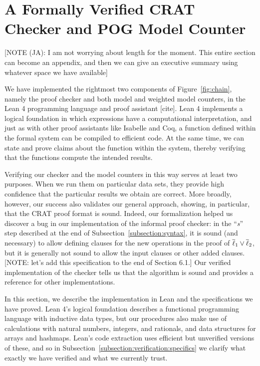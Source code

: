 \section{A Formally Verified CRAT Checker and POG Model Counter}

[NOTE (JA): I am not worrying about length for the moment. This entire section can become an appendix, and then we can give an executive summary using whatever space
we have available]

We have implemented the rightmost two components of Figure~\ref{fig:chain}, namely the
proof checker and both model and weighted model counters, in the Lean 4 programming language
and proof assistant [cite]. Lean 4 implements a logical foundation in which expressions
have a computational interpretation, and just as with other proof assistants like Isabelle and Coq,
a function defined within the formal system can be compiled to efficient code.
At the same time, we can state and prove claims about the function within the system, thereby
verifying that the functions compute the intended results.

Verifying our checker and the model counters in this way serves at least two purposes.
When we run them on particular data sets, they provide high confidence
that the particular results we obtain are correct.
More broadly, however, our success also validates our general approach,
showing, in particular, that the CRAT proof format is sound.
Indeed, our formalization helped us discover a bug in our implementation
of the informal proof checker: in the ``\emph{s}'' step described at the end of Subsection~\ref{subsection:syntax}, it is sound (and necessary) to allow defining
clauses for the new operations in the proof of $\overline{\ell}_1 \lor \overline{\ell}_2$,
but it is generally not sound to allow the input clauses or other added clauses. [NOTE: let's add this specification to the end of Section 6.1.]
Our verified implementation of the checker tells us that the algorithm is sound and provides a reference for other implementations.

In this section, we describe the implementation in Lean and the specifications we have proved.
Lean 4's logical foundation describes a functional programming language with
inductive data types,
but our procedures also make use of calculations with natural numbers, integers, and rationals,
and data structures for arrays and hashmaps.
Lean's code extraction uses efficient but unverified versions of these,
and so in Subsection~\ref{subsection:verification:specifics} we clarify
what exactly we have verified and what we currently trust.

